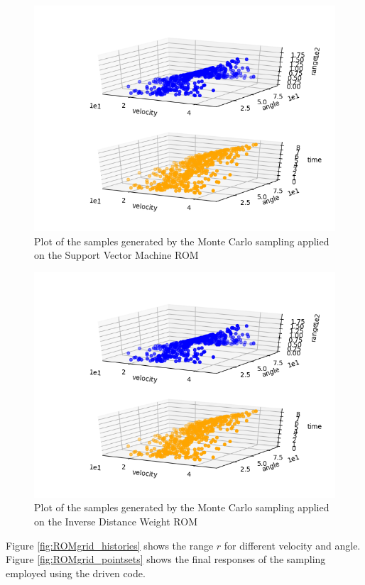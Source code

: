  \begin{figure}[h!]
  \centering
  \includegraphics[scale=0.7]{../../tests/framework/user_guide/ReducedOrderModeling/gold/ROMConstruction/1-samplesPlot3DROMsvm_scatter-scatter.png}
  \caption{Plot of the samples generated by the Monte Carlo sampling applied on the Support Vector Machine ROM}
  \label{fig:ROMsvm_samples}
 \end{figure}
 \begin{figure}[h!]
  \centering
  \includegraphics[scale=0.7]{../../tests/framework/user_guide/ReducedOrderModeling/gold/ROMConstruction/1-samplesPlot3DROMinverse_scatter-scatter.png}
  \caption{Plot of the samples generated by the Monte Carlo sampling applied on the Inverse Distance Weight ROM}
  \label{fig:ROMinverse_samples}
 \end{figure}
 Figure \ref{fig:ROMgrid_histories}
 shows the range $r$ for different velocity and angle.
 Figure \ref{fig:ROMgrid_pointsets} shows the final responses  of the sampling employed using the driven code.

